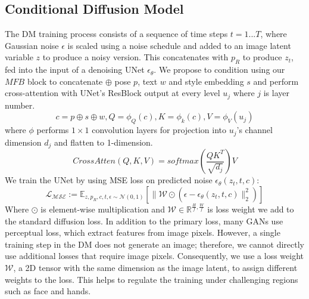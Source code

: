 \documentclass[10pt,twocolumn,letterpaper]{article}
\begin{document}
\subsection{Conditional Diffusion Model}
The DM training process consists of a sequence of time steps $t=1...T$, where Gaussian noise $\epsilon$ is scaled using a noise schedule \cite{diffusion_model} and added to an image latent variable $z$ to produce a noisy version. This concatenates with $p_R$ to produce $z_t$, fed into the input of a denoising UNet $\epsilon_{\theta}$. We propose to condition using our $MFB$ block to concatenate $\oplus$  pose $p$, text $w$ and style embedding $s$ and perform cross-attention with  UNet's ResBlock output at every level $u_j$ where $j$ is layer number.
\vspace{-2mm}
\begin{equation}
    c = p \oplus s \oplus w, Q = \phi_Q(c),K= \phi_k(c),V = \phi_V(u_j)
\end{equation}
where $\phi$ performs $1\times1$ convolution layers for projection into $u_j$'s channel dimension $d_j$ and flatten to 1-dimension.
\vspace{-2mm}
\begin{equation}
    CrossAtten(Q, K, V) = softmax(\frac{QK^T}{\sqrt{d_j}}) V
\end{equation}
\vspace{-2mm}
We train the UNet by using MSE loss on predicted noise $\epsilon_{\theta}(z_t, t, c)$:
\begin{equation}
    \mathcal{L_{MSE}}  := \mathbb{E}_{z,p_R, c,t,\epsilon \sim \mathcal{N}(0,1)} \left[\| \mathcal{W}\odot(\epsilon -\epsilon_{\theta}(z_t, t, c) \|^2_2)\right]
    \label{eq:mse}
\end{equation}
Where $\odot$ is element-wise multiplication and $\mathcal{W} \in \mathbb{R}^{\frac{H}{f}, \frac{W}{f}} $ is loss weight we add to the standard diffusion loss. In addition to the primary loss, many GANs\cite{pise, gfla, casd, nted} use perceptual loss\cite{perceptual_loss}, which extract features from image pixels. However, a single training step in the DM does not generate an image; therefore, we cannot directly use additional losses that require image pixels. Consequently, we use a loss weight $\mathcal{W}$, a 2D tensor with the same dimension as the image latent, to assign different weights to the loss. This helps to regulate the training under challenging regions such as face and hands.
\end{document}
